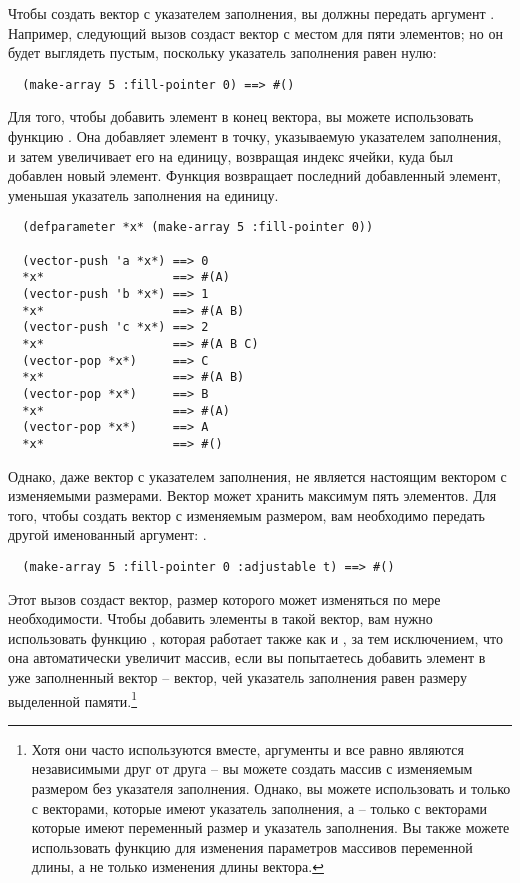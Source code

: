 Чтобы создать вектор с указателем заполнения, вы должны передать 
аргумент .  Например, следующий вызов  создаст вектор
с местом для пяти элементов; но он будет выглядеть пустым, поскольку указатель заполнения
равен нулю:

\begin{verbatim}
  (make-array 5 :fill-pointer 0) ==> #()
\end{verbatim}

Для того, чтобы добавить элемент в конец вектора, вы можете использовать функцию
.  Она добавляет элемент в точку, указываемую указателем заполнения, и
затем увеличивает его на единицу, возвращая индекс ячейки, куда был добавлен новый
элемент.  Функция  возвращает последний добавленный элемент, уменьшая
указатель заполнения на единицу.

\begin{verbatim}
  (defparameter *x* (make-array 5 :fill-pointer 0))
  
  (vector-push 'a *x*) ==> 0
  *x*                  ==> #(A)
  (vector-push 'b *x*) ==> 1
  *x*                  ==> #(A B)
  (vector-push 'c *x*) ==> 2
  *x*                  ==> #(A B C)
  (vector-pop *x*)     ==> C
  *x*                  ==> #(A B)
  (vector-pop *x*)     ==> B
  *x*                  ==> #(A)
  (vector-pop *x*)     ==> A
  *x*                  ==> #()
\end{verbatim}

Однако, даже вектор с указателем заполнения, не является настоящим вектором с изменяемыми
размерами.  Вектор  может хранить максимум пять элементов.  Для того, чтобы
создать вектор с изменяемым размером, вам необходимо передать  другой
именованный аргумент: .

\begin{verbatim}
  (make-array 5 :fill-pointer 0 :adjustable t) ==> #()
\end{verbatim}

Этот вызов создаст вектор, размер которого может изменяться по мере необходимости.  Чтобы
добавить элементы в такой вектор, вам нужно использовать функцию
, которая работает также как и , за тем
исключением, что она автоматически увеличит массив, если вы попытаетесь добавить элемент в
уже заполненный вектор -- вектор, чей указатель заполнения равен размеру выделенной
памяти.\footnote{Хотя они часто используются вместе, аргументы  и
   все равно являются независимыми друг от друга -- вы можете создать
  массив с изменяемым размером без указателя заполнения.  Однако, вы можете использовать
   и  только с векторами, которые имеют указатель
  заполнения, а  -- только с векторами которые имеют переменный
  размер и указатель заполнения.  Вы также можете использовать функцию 
  для изменения параметров массивов переменной длины, а не только изменения длины
  вектора.}


